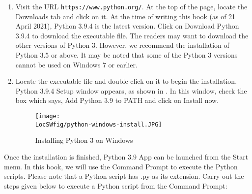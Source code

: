 \begin{enumerate}
      \item Visit the URL {\tt https://www.python.org/}. 
      At the top of the page, locate the Downloads tab and click on it. 
      At the time of writing this book (as of 21 April 2021), Python 3.9.4 
      is the latest version. Click on Download Python 3.9.4 to download the 
      executable file. The readers may want to download the other versions of 
      Python 3. However, we recommend the installation of Python 3.5 or above. 
      It may be noted that some of the Python 3 versions cannot be used on Windows 7 or earlier.
      \item Locate the executable file and double-click on it to begin the 
      installation. Python 3.9.4 Setup window appears, as shown in . 
      In this window, check the box which says, Add Python 3.9 to PATH and 
      click on Install now.  
      \begin{figure}
            \centering
            \texttt{[image: \\LocSWfig/python-windows-install.JPG]}
            \caption{Installing Python 3 on Windows}
            \label{python-windows}
      \end{figure}
\end{enumerate}

Once the installation is finished, Python 3.9 App can be launched 
from the Start menu. In this book, we will use the Command Prompt to 
execute the Python scripts. Please note that a Python script has .py as its 
extension. Carry out the steps given below to execute a Python script from 
the Command Prompt:

